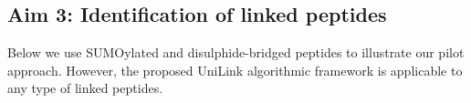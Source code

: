 



\subsection{Aim 3: Identification of linked peptides} 

Below we use SUMOylated and disulphide-bridged peptides to illustrate our pilot approach. However, the proposed UniLink algorithmic framework is applicable to any type of linked peptides. 

